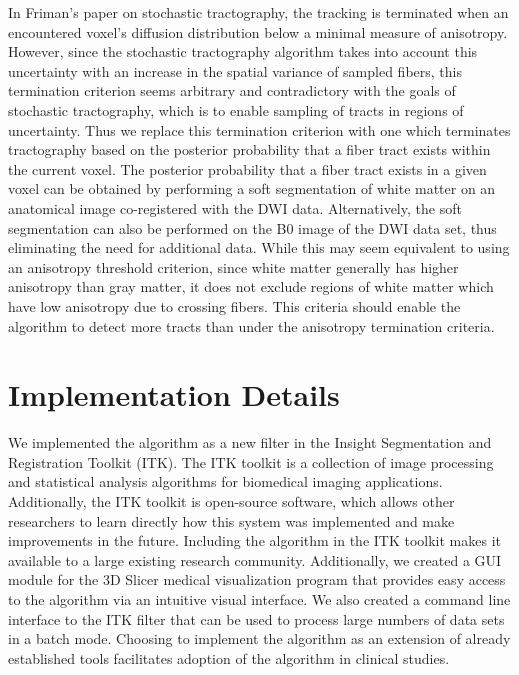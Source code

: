 \documentclass{InsightArticle}
\begin{document}
In Friman's paper on stochastic tractography, the tracking is terminated when an encountered voxel's diffusion distribution below a minimal measure of anisotropy.  However, since the stochastic tractography algorithm takes into account this uncertainty with an increase in the spatial variance of sampled fibers, this termination criterion seems arbitrary and contradictory with the goals of stochastic tractography, which is to enable sampling of tracts in regions of uncertainty.  Thus we replace this termination criterion with one which terminates tractography based on the posterior probability that a fiber tract exists within the current voxel.  The posterior probability that a fiber tract exists in a given voxel can be obtained by performing a soft segmentation of white matter on an anatomical image co-registered with the DWI data.  Alternatively, the soft segmentation can also be performed on the B0 image of the DWI data set, thus eliminating the need for additional data.  While this may seem equivalent to using an anisotropy threshold criterion, since white matter generally has higher anisotropy than gray matter, it does not exclude regions of white matter which have low anisotropy due to crossing fibers.  This criteria should enable the algorithm to detect more tracts than under the anisotropy termination criteria.


\section{Implementation Details}

We implemented the algorithm as a new filter in the Insight Segmentation and Registration Toolkit (ITK).  The ITK toolkit is a collection of image processing and statistical analysis algorithms for biomedical imaging applications.  Additionally, the ITK toolkit is open-source software, which allows other researchers to learn directly how this system was implemented and make improvements in the future.  Including the algorithm in the ITK toolkit makes it available to a large existing research community.  Additionally, we created a GUI module for the 3D Slicer medical visualization program that provides easy access to the algorithm via an intuitive visual interface.  We also created a command line interface to the ITK filter that can be used to process large numbers of data sets in a batch mode.  Choosing to implement the algorithm as an extension of already established tools facilitates adoption of the algorithm in clinical studies.
\end{document}
